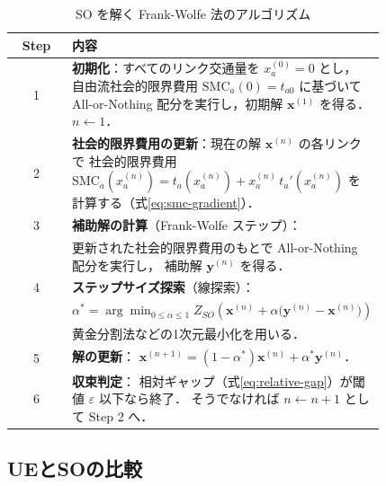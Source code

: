 \begin{table}[hbtp]
  \centering
  \caption{SO を解く Frank-Wolfe 法のアルゴリズム}
  \label{tab:so-fw-algorithm}
  \begin{tabular}{cp{0.82\linewidth}}
    \toprule
    Step & 内容 \\
    \midrule
    1 & \textbf{初期化}：すべてのリンク交通量を $x_a^{(0)}=0$ とし，
        自由流社会的限界費用 $\mathrm{SMC}_a(0)=t_{a0}$ に基づいて
        All-or-Nothing 配分を実行し，初期解 $\boldsymbol{x}^{(1)}$ を得る．$n \leftarrow 1$．
        \\[4pt]
    2 & \textbf{社会的限界費用の更新}：現在の解 $\boldsymbol{x}^{(n)}$ の各リンクで
        社会的限界費用
        $\mathrm{SMC}_a\!\left(x_a^{(n)}\right)
         = t_a\!\left(x_a^{(n)}\right) + x_a^{(n)}\,t_a'\!\left(x_a^{(n)}\right)$
        を計算する（式\eqref{eq:smc-gradient}）．
        \\[4pt]
    3 & \textbf{補助解の計算}（Frank-Wolfe ステップ）：\\
      & 更新された社会的限界費用のもとで All-or-Nothing 配分を実行し，
        補助解 $\boldsymbol{y}^{(n)}$ を得る．
        \\[4pt]
    4 & \textbf{ステップサイズ探索}（線探索）：\\
      & \quad $\alpha^* = \arg\min_{0 \leq \alpha \leq 1}
        Z_{SO}\!\left(\boldsymbol{x}^{(n)} + \alpha
        \bigl(\boldsymbol{y}^{(n)} - \boldsymbol{x}^{(n)}\bigr)\right)$\\[2pt]
      & 黄金分割法などの1次元最小化を用いる．
        \\[4pt]
    5 & \textbf{解の更新}：
        $\boldsymbol{x}^{(n+1)} = (1-\alpha^*)\boldsymbol{x}^{(n)}
        + \alpha^* \boldsymbol{y}^{(n)}$．
        \\[4pt]
    6 & \textbf{収束判定}：
        相対ギャップ（式\eqref{eq:relative-gap}）が閾値 $\varepsilon$ 以下なら終了．
        そうでなければ $n \leftarrow n+1$ として Step 2 へ．
        \\
    \bottomrule
  \end{tabular}
\end{table}

\subsection{UEとSOの比較}
\label{subsec:ue-so-comparison}

